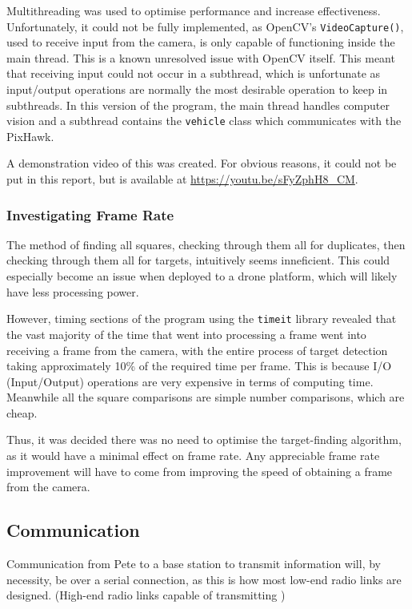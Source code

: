\documentclass[11pt]{article}
\begin{document}
Multithreading was used to optimise performance and increase effectiveness. Unfortunately, it could not be fully implemented, as OpenCV's \lstinline|VideoCapture()|, used to receive input from the camera, is only capable of functioning inside the main thread. This is a known unresolved issue with OpenCV itself. This meant that receiving input could not occur in a subthread, which is unfortunate as input/output operations are normally the most desirable operation to keep in subthreads. In this version of the program, the main thread handles computer vision and a subthread contains the \lstinline|vehicle| class which communicates with the PixHawk. \label{OpenCV_multithreading_issues}

A demonstration video of this was created. For obvious reasons, it could not be put in this report, but is available at \url{https://youtu.be/sFyZphH8_CM}.

\subsubsection{Investigating Frame Rate}
The method of finding all squares, checking through them all for duplicates, then checking through them all for targets, intuitively seems inneficient. This could especially become an issue when deployed to a drone platform, which will likely have less processing power.

However, timing sections of the program using the \lstinline|timeit| library revealed that the vast majority of the time that went into processing a frame went into receiving a frame from the camera, with the entire process of target detection taking approximately 10\% of the required time per frame. This is because I/O (Input/Output) operations are very expensive in terms of computing time. Meanwhile all the square comparisons are simple number comparisons, which are cheap.

Thus, it was decided there was no need to optimise the target-finding algorithm, as it would have a minimal effect on frame rate. Any appreciable frame rate improvement will have to come from improving the speed of obtaining a frame from the camera.

\subsection{Communication}
Communication from Pete to a base station to transmit information will, by necessity, be over a serial connection, as this is how most low-end radio links are designed. (High-end radio links capable of transmitting )
\end{document}
